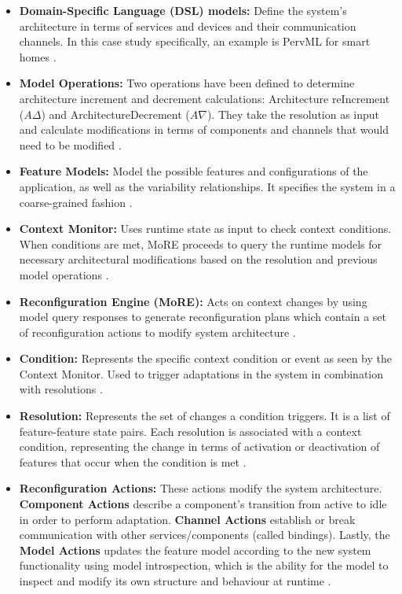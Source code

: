 \documentclass[conference]{IEEEtran}
\begin{document}
\begin{itemize}
	\item \textbf{Domain-Specific Language (DSL) models:} Define the system's architecture in terms of services and devices and their communication channels. In this case study specifically, an example is PervML for smart homes \cite{MORE_pdf}.

	\item \textbf{Model Operations:} Two operations have been defined to determine architecture increment and decrement calculations: Architecture reIncrement ($A\Delta$) and ArchitectureDecrement ($A\nabla$). They take the resolution as input and calculate modifications in terms of components and channels that would need to be modified \cite{MORE_pdf}.

	\item \textbf{Feature Models:} Model the possible features and configurations of the application, as well as the variability relationships. It specifies the system in a coarse-grained fashion \cite{MORE_pdf}.

	\item \textbf{Context Monitor:} Uses runtime state as input to check context conditions. When conditions are met, MoRE proceeds to query the runtime models for necessary architectural modifications based on the resolution and previous model operations \cite{MORE_pdf}.

	\item \textbf{Reconfiguration Engine (MoRE):} Acts on context changes by using model query responses to generate reconfiguration plans which contain a set of reconfiguration actions to modify system architecture \cite{MORE_pdf}.

	\item \textbf{Condition:} Represents the specific context condition or event as seen by the Context Monitor. Used to trigger adaptations in the system in combination with resolutions \cite{MORE_pdf}.

	\item \textbf{Resolution:} Represents the set of changes a condition triggers. It is a list of feature-feature state pairs. Each resolution is associated with a context condition, representing the change in terms of activation or deactivation of features that occur when the condition is met \cite{MORE_pdf}.

	\item \textbf{Reconfiguration Actions:} These actions modify the system architecture. \textbf{Component Actions} describe a component's transition from active to idle in order to perform adaptation. \textbf{Channel Actions} establish or break communication with other services/components (called bindings). Lastly, the \textbf{Model Actions} updates the feature model according to the new system functionality using model introspection, which is the ability for the model to inspect and modify its own structure and behaviour at runtime \cite{MORE_pdf}.
\end{itemize}
\end{document}
